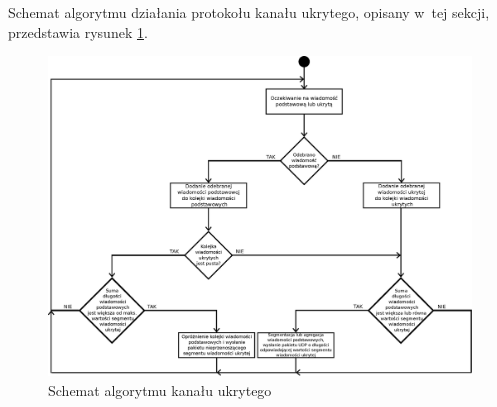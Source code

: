 \documentclass[a4paper, twoside, 12pt]{report}
\begin{document}
    Schemat algorytmu działania protokołu kanału ukrytego, opisany w~tej sekcji,
    przedstawia rysunek \ref{CHANNELALGORITHM}.

        \begin{figure}[tp]
                \centering
                \includegraphics[scale=0.60, angle=90]{algorytm_kanalu_ukrytego}
                \caption{Schemat algorytmu kanału ukrytego}
                \label{CHANNELALGORITHM}
        \end{figure}
\end{document}
